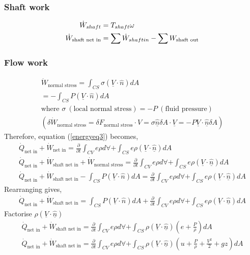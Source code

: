 \documentclass[class=report, crop=false, 12pt,a4paper]{standalone}
\begin{document}
\subsubsection{Shaft work}
\begin{align}
  \dot{W}_{shaft} &= T_{shaft} \omega\\
  \dot{W}_{\textrm{shaft net in}} &= \sum \dot{W}_{shaft in} - \sum \do{W}_{\textrm{shaft out}}
\end{align}
\subsubsection{Flow work}
\begin{gather}
  \dot{W}_{\textrm{normal stress}} = \int_{CS} \sigma (\underline{V}\cdot \hat{n}) dA\\
  = - \int_{CS} P (\underline{V}\cdot \hat{n}) dA\\
  \textrm{where } \sigma \ (\textrm{local normal stress}) = - P \ (\textrm{fluid pressure})\\
  (\delta \dot{W}_{\textrm{normal stress}} = \delta F_{\textrm{normal stress}} \cdot V = \sigma \underline{\hat{n}} \delta A \cdot \underline{V} = -P\underline{V} \cdot \underline{\hat{n}} \delta A )
\end{gather}
Therefore, equation (\ref{energyeq3}) becomes,
\begin{gather}
  \dot{Q}_{\textrm{net in}} + \dot{W}_{\textrm{net in}} = \frac{\partial}{\partial t} \int_{CV} e \rho d \forall + \int_{CS} e \rho (\underline{V} \cdot \underline{\hat{n}}) dA\\
  \dot{Q}_{\textrm{net in}} + \dot{W}_{\textrm{shaft net in}} + \dot{W}_{\textrm{normal stress}} = \frac{\partial}{\partial t} \int_{CV} e \rho d \forall + \int_{CS} e \rho (\underline{V} \cdot \underline{\hat{n}}) dA\\
  \dot{Q}_{\textrm{net in}} + \dot{W}_{\textrm{shaft net in}} - \int_{CS} P (\underline{V}\cdot \hat{n}) dA = \frac{\partial}{\partial t} \int_{CV} e \rho d \forall + \int_{CS} e \rho (\underline{V} \cdot \underline{\hat{n}}) dA
\end{gather}
Rearranging gives,
\begin{gather}
  \dot{Q}_{\textrm{net in}} + \dot{W}_{\textrm{shaft net in}} = \int_{CS} P (\underline{V}\cdot \hat{n}) dA + \frac{\partial}{\partial t} \int_{CV} e \rho d \forall + \int_{CS} e \rho (\underline{V} \cdot \underline{\hat{n}}) dA
\end{gather}
Factorise $\rho (\underline{V}\cdot \underline{\hat{n}})$
\begin{gather}
  \dot{Q}_{\textrm{net in}} + \dot{W}_{\textrm{shaft net in}} = \frac{\partial}{\partial t} \int_{CV} e \rho d \forall + \int_{CS} \rho (\underline{V} \cdot \underline{\hat{n}})(e + \frac{P}{\rho}) dA\\
  \dot{Q}_{\textrm{net in}} + \dot{W}_{\textrm{shaft net in}} = \frac{\partial}{\partial t} \int_{CV} e \rho d \forall + \int_{CS} \rho (\underline{V} \cdot \underline{\hat{n}})(u + \frac{P}{\rho} + \frac{V^2}{2} + gz) dA
\end{gather}
\end{document}
